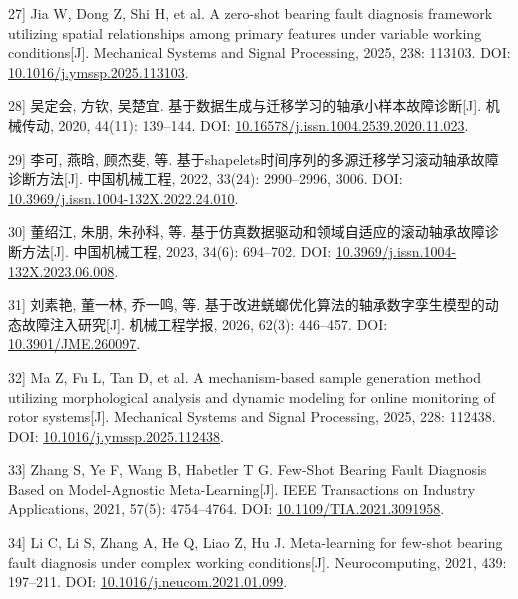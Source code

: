 \documentclass[UTF8,12pt,openany,twoside]{ctexbook}
\numberwithin{equation}{chapter}
\begin{document}
\noindent\begingroup\samepage {[}27{]} Jia W, Dong Z, Shi H, et al. A zero-shot bearing fault diagnosis framework utilizing spatial relationships among primary features under variable working conditions[J]. Mechanical Systems and Signal Processing, 2025, 238: 113103. DOI: \url{10.1016/j.ymssp.2025.113103}.\par\endgroup

\noindent\begingroup\samepage {[}28{]} 吴定会, 方钦, 吴楚宜. 基于数据生成与迁移学习的轴承小样本故障诊断[J]. 机械传动, 2020, 44(11): 139--144. DOI: \url{10.16578/j.issn.1004.2539.2020.11.023}.\par\endgroup

\noindent\begingroup\samepage {[}29{]} 李可, 燕晗, 顾杰斐, 等. 基于shapelets时间序列的多源迁移学习滚动轴承故障诊断方法[J]. 中国机械工程, 2022, 33(24): 2990--2996, 3006. DOI: \url{10.3969/j.issn.1004-132X.2022.24.010}.\par\endgroup

\noindent\begingroup\samepage {[}30{]} 董绍江, 朱朋, 朱孙科, 等. 基于仿真数据驱动和领域自适应的滚动轴承故障诊断方法[J]. 中国机械工程, 2023, 34(6): 694--702. DOI: \url{10.3969/j.issn.1004-132X.2023.06.008}.\par\endgroup

\noindent\begingroup\samepage {[}31{]} 刘素艳, 董一林, 乔一鸣, 等. 基于改进蜣螂优化算法的轴承数字孪生模型的动态故障注入研究[J]. 机械工程学报, 2026, 62(3): 446--457. DOI: \url{10.3901/JME.260097}.\par\endgroup

\noindent\begingroup\samepage {[}32{]} Ma Z, Fu L, Tan D, et al. A mechanism-based sample generation method utilizing morphological analysis and dynamic modeling for online monitoring of rotor systems[J]. Mechanical Systems and Signal Processing, 2025, 228: 112438. DOI: \url{10.1016/j.ymssp.2025.112438}.\par\endgroup

\noindent\begingroup\samepage {[}33{]} Zhang S, Ye F, Wang B, Habetler T G. Few-Shot Bearing Fault Diagnosis Based on Model-Agnostic Meta-Learning[J]. IEEE Transactions on Industry Applications, 2021, 57(5): 4754--4764. DOI: \url{10.1109/TIA.2021.3091958}.\par\endgroup

\noindent\begingroup\samepage {[}34{]} Li C, Li S, Zhang A, He Q, Liao Z, Hu J. Meta-learning for few-shot bearing fault diagnosis under complex working conditions[J]. Neurocomputing, 2021, 439: 197--211. DOI: \url{10.1016/j.neucom.2021.01.099}.\par\endgroup
\end{document}
